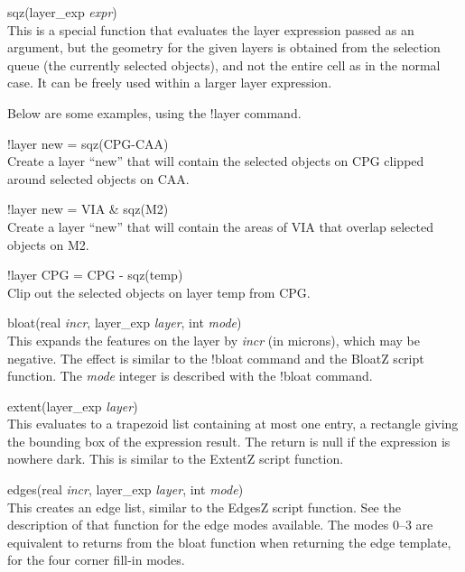 \begin{description}
\item{\vt sqz}(layer\_exp {\it expr\/})\\
This is a special function that evaluates the layer expression passed
as an argument, but the geometry for the given layers is obtained from
the selection queue (the currently selected objects), and not the
entire cell as in the normal case.  It can be freely used within a
larger layer expression.

Below are some examples, using the {\cb !layer} command.

\begin{description}
\item{\vt !layer new = sqz(CPG-CAA)}\\
Create a layer ``new'' that will contain the selected objects on CPG
clipped around selected objects on CAA.
\item{\vt !layer new = VIA \& sqz(M2)}\\
Create a layer ``new'' that will contain the areas of VIA that overlap
selected objects on M2.
\item{\vt !layer CPG = CPG - sqz(temp)}\\
Clip out the selected objects on layer temp from CPG.
\end{description}

\item{\vt bloat}(real {\it incr\/}, layer\_exp {\it layer\/},
 int {\it mode\/})\\
This expands the features on the layer by {\it incr} (in microns),
which may be negative.  The effect is similar to the {\cb !bloat}
command and the {\vt BloatZ} script function.  The {\it mode} integer
is described with the {\cb !bloat} command.

\item{\vt extent}(layer\_exp {\it layer\/})\\
This evaluates to a trapezoid list containing at most one entry, a
rectangle giving the bounding box of the expression result.  The
return is null if the expression is nowhere dark.  This is similar to
the {\vt ExtentZ} script function.

\item{\vt edges}(real {\it incr\/}, layer\_exp {\it layer\/},
 int {\it mode\/})\\
This creates an edge list, similar to the {\vt EdgesZ} script
function.  See the description of that function for the edge modes
available.  The modes 0--3 are equivalent to returns from the {\vt
bloat} function when returning the edge template, for the four corner
fill-in modes.


\end{description}
